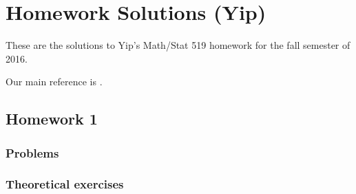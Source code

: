 \section{Homework Solutions (Yip)}
These are the solutions to Yip's Math/Stat 519 homework for the fall
semester of 2016.

Our main reference is \cite{ross}.

\subsection{Homework 1}
\subsubsection{Problems}
\begin{problem}[Ross, \S 1, \# 7]
\end{problem}
\begin{solution*}
\end{solution*}

\begin{problem}[Ross, \S 1, \# 11]
\end{problem}
\begin{solution*}
\end{solution*}

\begin{problem}[Ross, \S 1, \# 19]
\end{problem}
\begin{solution*}
\end{solution*}

\begin{problem}[Ross, \S 1, \# 21]
\end{problem}
\begin{solution*}
\end{solution*}

\begin{problem}[Ross, \S 1, \# 22]
\end{problem}
\begin{solution*}
\end{solution*}

\begin{problem}[Ross, \S 1, \# 33]
\end{problem}
\begin{solution*}
\end{solution*}

\subsubsection{Theoretical exercises}
\begin{problem}[Ross, \S 1, \# 5]
\end{problem}
\begin{solution*}
\end{solution*}

